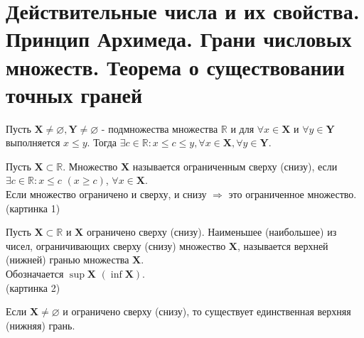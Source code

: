 \section{Действительные числа и их свойства. Принцип Архимеда. Грани числовых множеств. Теорема о существовании точных граней}

\begin{myax} 
	Пусть $\mathbf{X} \neq \varnothing, \mathbf{Y} \neq \varnothing$ - подмножества множества $\mathbb{R}$ и для $\forall x \in \mathbf{X}$ и $\forall y \in \mathbf{Y}$ выполняется $x \leq y$. Тогда $\exists c \in \mathbb{R}: x \leq c \leq y, \forall x \in \mathbf{X}, \forall y \in \mathbf{Y}$. 
\end{myax}

\begin{definition}
	Пусть $\mathbf{X} \subset \mathbb{R}$. Множество $\mathbf{X}$ называется ограниченным сверху (снизу), если $\exists c \in \mathbb{R}: x \leq c$ $(x \geq c)$, $\forall x \in \mathbf{X}$. \\
	Если множество ограничено и сверху, и снизу $\Rightarrow$ это ограниченное множество. \\
	(картинка 1)
\end{definition}

\begin{definition}
	Пусть $\mathbf{X} \subset \mathbb{R}$ и $\mathbf{X}$ ограничено сверху (снизу). Наименьшее (наибольшее) из чисел, ограничивающих сверху (снизу) множество $\mathbf{X}$, называется верхней (нижней) гранью множества $\mathbf{X}$. \\
	Обозначается $\sup \mathbf{X}$ $(\inf \mathbf{X})$. \\
	(картинка 2)
\end{definition}

\begin{theorem}
	Если $\mathbf{X} \neq \varnothing$ и ограничено сверху (снизу), то существует единственная верхняя (нижняя) грань.
\end{theorem}

